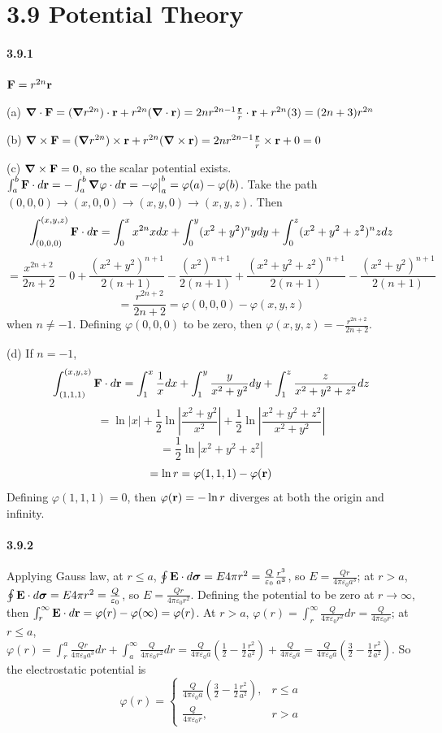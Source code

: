 \documentclass[a4paper]{article}
\begin{document}
\section*{3.9 Potential Theory}

\paragraph{3.9.1}
$\mathbf{F}=r^{2n}\mathbf{r}$
\medskip

(a) $\boldsymbol{\nabla}\cdot\mathbf{F}=(\boldsymbol{\nabla} r^{2n})\cdot\mathbf{r}+r^{2n}(\boldsymbol{\nabla}\cdot\mathbf{r})=2nr^{2n-1}\frac{\mathbf{r}}{r}\cdot\mathbf{r}+r^{2n}(3)=(2n+3)r^{2n}$
\medskip

(b) $\boldsymbol{\nabla}\times\mathbf{F}=(\boldsymbol{\nabla} r^{2n})\times\mathbf{r}+r^{2n}(\boldsymbol{\nabla}\times\mathbf{r})=2nr^{2n-1}\frac{\mathbf{r}}{r}\times\mathbf{r}+0=0$
\medskip

(c) $\boldsymbol{\nabla}\times\mathbf{F}=0$, so the scalar potential exists. $\int_a^b\mathbf{F}\cdot d\mathbf{r}=-\int_a^b\boldsymbol{\nabla}\varphi\cdot d\mathbf{r}=-\varphi\big|_a^b=\varphi(a)-\varphi(b)$. Take the path $(0,0,0)\rightarrow(x,0,0)\rightarrow(x,y,0)\rightarrow(x,y,z)$. Then
\[
\int_{(0,0,0)}^{(x,y,z)}\mathbf{F}\cdot d\mathbf{r}=\int_0^x x^{2n}xdx+\int_0^y(x^2+y^2)^nydy+\int_0^z(x^2+y^2+z^2)^nzdz
\]
\[
=\frac{x^{2n+2}}{2n+2}-0+\frac{(x^2+y^2)^{n+1}}{2(n+1)}-\frac{(x^2)^{n+1}}{2(n+1)}+\frac{(x^2+y^2+z^2)^{n+1}}{2(n+1)}-\frac{(x^2+y^2)^{n+1}}{2(n+1)}
\]
\[
=\frac{r^{2n+2}}{2n+2}=\varphi(0,0,0)-\varphi(x,y,z)
\]
when $n\neq-1$. Defining $\varphi(0,0,0)$ to be zero, then $\varphi(x,y,z)=-\frac{r^{2n+2}}{2n+2}$.
\medskip

(d) If $n=-1$, 
\[
\int_{(1,1,1)}^{(x,y,z)}\mathbf{F}\cdot d\mathbf{r}=\int_1^x \frac{1}{x}dx+\int_1^y\frac{y}{x^2+y^2}dy+\int_1^z\frac{z}{x^2+y^2+z^2}dz
\]
\[
=\ln|x|+\frac{1}{2}\ln|\frac{x^2+y^2}{x^2}|+\frac{1}{2}\ln|\frac{x^2+y^2+z^2}{x^2+y^2}|
\]
\[
=\frac{1}{2}\ln|x^2+y^2+z^2|\]
\[=\ln r=\varphi(1,1,1)-\varphi(\mathbf{r})
\]
Defining $\varphi(1,1,1)=0$, then $\varphi(\mathbf{r})=-\ln r$ diverges at both the origin and infinity.

\paragraph{3.9.2}
Applying Gauss law, at $r\leq a$, $\oint\mathbf{E}\cdot d\boldsymbol{\sigma}=E4\pi r^2=\frac{Q}{\varepsilon_0}\frac{r^3}{a^3}$, so $E=\frac{Qr}{4\pi\varepsilon_0a^3}$; at $r>a$, $\oint\mathbf{E}\cdot d\boldsymbol{\sigma}=E4\pi r^2=\frac{Q}{\varepsilon_0}$, so $E=\frac{Qr}{4\pi\varepsilon_0r^2}$. Defining the potential to be zero at $r\to\infty$, then $\int_r^\infty \mathbf{E}\cdot d\mathbf{r}=\varphi(r)-\varphi(\infty)=\varphi(r)$. At $r>a$, $\varphi(r)=\int_r^\infty\frac{Q}{4\pi\varepsilon_0r^2}dr=\frac{Q}{4\pi\varepsilon_0r}$; at $r\leq a$, $\varphi(r)=\int_r^a\frac{Qr}{4\pi\varepsilon_0a^3}dr+\int_a^\infty\frac{Q}{4\pi\varepsilon_0r^2}dr=\frac{Q}{4\pi\varepsilon_0a}\left(\frac{1}{2}-\frac{1}{2}\frac{r^2}{a^2} \right)+\frac{Q}{4\pi\varepsilon_0a}=\frac{Q}{4\pi\varepsilon_0a}\left(\frac{3}{2}-\frac{1}{2}\frac{r^2}{a^2} \right)$. So the electrostatic potential is 
\[
\varphi(r)=
\begin{cases}
\frac{Q}{4\pi\varepsilon_0a}\left(\frac{3}{2}-\frac{1}{2}\frac{r^2}{a^2} \right), & r\leq a\\
\frac{Q}{4\pi\varepsilon_0r}, & r>a
\end{cases}
\]
\end{document}
